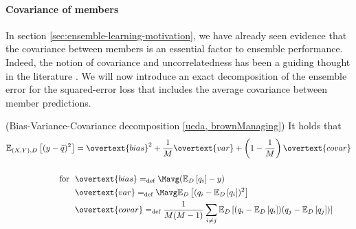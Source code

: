 \documentclass[../main.tex]{subfiles}
\begin{document}
\paragraph{Covariance of members}
In section \ref{sec:ensemble-learning-motivation}, we have already seen evidence that the covariance between members is an essential factor to ensemble performance. Indeed, the notion of covariance and uncorrelatedness has been a guiding thought in the literature \cite{didaci_DiversityClassifierEnsembles_2013, brown_ManagingDiversityRegression_2005, buschjager_GeneralizedNegativeCorrelation_2020}.
We will now introduce an exact decomposition of the ensemble error for the squared-error loss that includes the average covariance between member predictions.
\begin{theorem} (Bias-Variance-Covariance decomposition \ref{ueda, brownManaging})
  \label{thm:bias-variance-covariance}
It holds that
$$
\begin{align}
\mathbb{E}_{(X,Y),D}\left[ (y - \bar{q})^2 \right]  &= \overtext{bias}^2 + \frac{1}{M} \overtext{var} + \left( 1 - \frac{1}{M} \right) \overtext{covar} \\ \\ 
\text{for} ~ ~ & \overtext{bias} =_{\text{def}} \Mavg (\mathbb{E}_{D}\left[ q_{i}  \right] - y) \\
& \overtext{var} =_{\text{def}} \Mavg \mathbb{E}_{D}\left[ (q_{i} - \mathbb{E}_{D}\left[ q_{i} \right])^2  \right]  \\
& \overtext{covar} =_{\text{def}} \frac{1}{M(M-1)} \sum_{i \not= j} \mathbb{E}_{D}\left[ (q_{i} - \mathbb{E}_{D}\left[ q_{i} \right] ) (q_{j} - \mathbb{E}_{D}\left[ q_{j} \right] ) \right] 
\end{align}
$$
\end{theorem}
\end{document}
